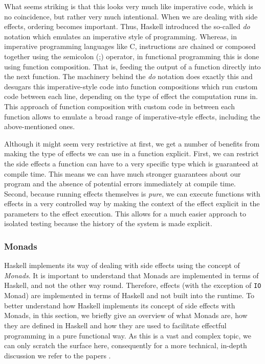 What seems striking is that this looks very much like imperative code, which is no coincidence, but rather very much intentional. When we are dealing with side effects, ordering becomes important. Thus, Haskell introduced the so-called \textit{do} notation which emulates an imperative style of programming. Whereas, in imperative programming languages like C, instructions are chained or composed together using the semicolon (;) operator, in functional programming this is done using function composition. That is, feeding the output of a function directly into the next function. The machinery behind the \textit{do} notation does exactly this and desugars this imperative-style code into function compositions which run custom code between each line, depending on the type of effect the computation runs in. This approach of function composition with custom code in between each function allows to emulate a broad range of imperative-style effects, including the above-mentioned ones.

Although it might seem very restrictive at first, we get a number of benefits from making the type of effects we can use in a function explicit. First, we can restrict the side effects a function can have to a very specific type which is guaranteed at compile time. This means we can have much stronger guarantees about our program and the absence of potential errors immediately at compile time. Second, because running effects themselves is \textit{pure}, we can execute functions with effects in a very controlled way by making the context of the effect explicit in the parameters to the effect execution. This allows for a much easier approach to isolated testing because the history of the system is made explicit. 

\subsubsection{Monads}
Haskell implements its way of dealing with side effects using the concept of \textit{Monads}. It is important to understand that Monads are implemented in terms of Haskell, and not the other way round. Therefore, effects (with the exception of \texttt{IO} Monad) are implemented in terms of Haskell and not built into the runtime. To better understand how Haskell implements its concept of side effects with Monads, in this section, we briefly give an overview of what Monads are, how they are defined in Haskell and how they are used to facilitate effectful programming in a pure functional way. As this is a vast and complex topic, we can only scratch the surface here, consequently for a more technical, in-depth discussion we refer to the papers \cite{jones_tackling_2002,moggi_computational_1989,wadler_essence_1992,wadler_monads_1995,wadler_how_1997}.

